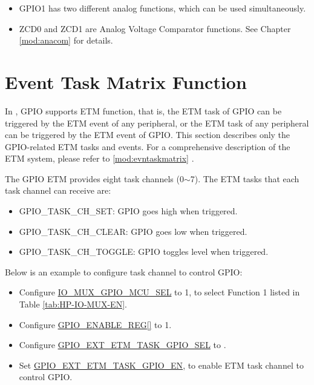 \documentclass[main\_\_EN.tex]{subfiles}
\begin{document}
\begin{tiplisting}
    \vspace{-2em}
    \begin{itemize}
    \item GPIO1 has two different analog functions, which can be used simultaneously.
    \item ZCD0 and ZCD1 are Analog Voltage Comparator functions. See Chapter \ref{mod:anacom} \textit{} for details.
    \end{itemize}
\end{tiplisting}

\section{Event Task Matrix Function}

In \chipname{}, GPIO supports ETM function, that is, the ETM task of GPIO can be triggered by the ETM event of any peripheral, or the ETM task of any peripheral can be triggered by the ETM event of GPIO. This section describes only the GPIO-related ETM tasks and events. For a comprehensive description of the ETM system, please refer to \ref{mod:evntaskmatrix} \textit{}. 

The GPIO ETM provides eight task channels  (0$\sim$7). The ETM tasks that each task channel can receive are:

\begin{itemize}
    \item GPIO\_TASK\_CH\_SET: GPIO goes high when triggered.
    \item GPIO\_TASK\_CH\_CLEAR: GPIO goes low when triggered.
    \item GPIO\_TASK\_CH\_TOGGLE: GPIO toggles level when triggered.
\end{itemize}

Below is an example to configure task channel   to control GPIO:

\begin{itemize}
    \item Configure \hyperref[fielddesc:IOMUXGPIONMCUSEL]{IO\_MUX\_GPIO\_MCU\_SEL} to 1, to select Function 1 listed in Table \ref{tab:HP-IO-MUX-EN}.
    \item Configure \hyperref[regdesc:GPIOENABLEREG]{GPIO\_ENABLE\_REG[]} to 1.
    \item Configure \hyperref[fielddesc:GPIOEXTETMTASKGPIO0SEL]{GPIO\_EXT\_ETM\_TASK\_GPIO\_SEL} to .
    \item Set \hyperref[fielddesc:GPIOEXTETMTASKGPIO0EN]{GPIO\_EXT\_ETM\_TASK\_GPIO\_EN}, to enable ETM task channel  to control GPIO.
\end{itemize}
\end{document}
